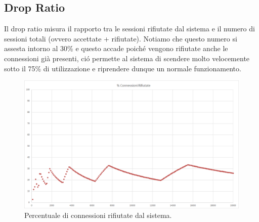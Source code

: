 \subsection{Drop Ratio}
Il drop ratio misura il rapporto tra le sessioni rifiutate dal sistema e il numero di sessioni totali (ovvero accettate + rifiutate).
Notiamo che questo numero si assesta intorno al 30\% e questo accade poich\'e vengono rifiutate anche le connessioni già presenti, ci\'o permette al sistema di scendere molto velocemente sotto il 75\% di utilizzazione e riprendere dunque un normale funzionamento.
\begin{figure}[H]
	\begin{center}
	\includegraphics[scale=0.4]{img/Drop_ratio.png}
	\caption[Percentuale di connessioni rifiutate dal sistema.]{Percentuale di connessioni rifiutate dal sistema.}
	\label{fig:confr_distrib}
	\end{center}
\end{figure}

